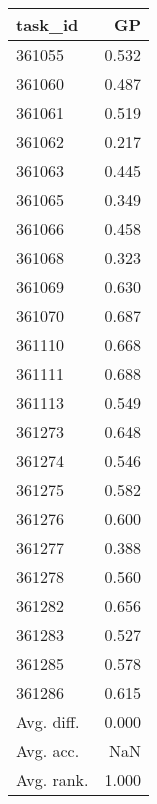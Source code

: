\begin{tabular}{lr}
\toprule
task\_id & GP \\
\midrule
361055 & 0.532 \\
361060 & 0.487 \\
361061 & 0.519 \\
361062 & 0.217 \\
361063 & 0.445 \\
361065 & 0.349 \\
361066 & 0.458 \\
361068 & 0.323 \\
361069 & 0.630 \\
361070 & 0.687 \\
361110 & 0.668 \\
361111 & 0.688 \\
361113 & 0.549 \\
361273 & 0.648 \\
361274 & 0.546 \\
361275 & 0.582 \\
361276 & 0.600 \\
361277 & 0.388 \\
361278 & 0.560 \\
361282 & 0.656 \\
361283 & 0.527 \\
361285 & 0.578 \\
361286 & 0.615 \\
Avg. diff. & 0.000 \\
Avg. acc. & NaN \\
Avg. rank. & 1.000 \\
\bottomrule
\end{tabular}
